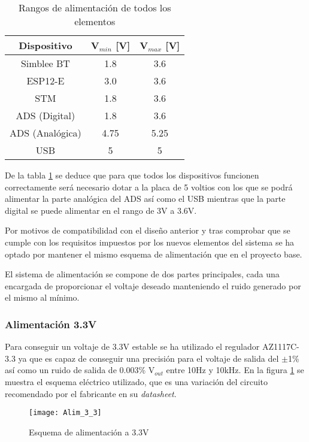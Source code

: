 \begin{table} [h]
	\centering
	\begin{tabular}{|c|c|c|}
	\hline 
	Dispositivo & V$_{min}$ [V] & V$_{max}$ [V] \\ 
	\hline 
	Simblee BT & 1.8 & 3.6 \\ 
	\hline 
	ESP12-E & 3.0 & 3.6 \\ 
	\hline 
	STM & 1.8 & 3.6 \\ 
	\hline 
	ADS (Digital) & 1.8 & 3.6 \\ 
	\hline 
	ADS (Analógica) & 4.75 & 5.25 \\ 
	\hline 
	USB & 5 & 5 \\ 
	\hline 
	\end{tabular} 
	\caption{Rangos de alimentación de todos los elementos}
	\label{tab:Alimentacion}
\end{table}

De la tabla \ref{tab:Alimentacion} se deduce que para que todos los dispositivos funcionen correctamente será necesario dotar a la placa de 5 voltios con los que se podrá alimentar la parte analógica del ADS así como el USB mientras que la parte digital se puede alimentar en el rango de 3V a 3.6V. 

Por motivos de compatibilidad con el diseño anterior y tras comprobar que se cumple con los requisitos impuestos por los nuevos elementos del sistema se ha optado por mantener el mismo esquema de alimentación que en el proyecto base.

El sistema de alimentación se compone de dos partes principales, cada una encargada de proporcionar el voltaje deseado manteniendo el ruido generado por el mismo al mínimo.

\subsubsection{Alimentación 3.3V\label{sec:Alimentacion_3.3V}}
Para conseguir un voltaje de 3.3V estable se ha utilizado el regulador AZ1117C-3.3 ya que es capaz de conseguir una precisión para el voltaje de salida del $\pm$1\% así como un ruido de salida de 0.003\% V$_{out}$ entre 10Hz y 10kHz.
En la figura \ref{fig:Alim_3.3} se muestra el esquema eléctrico utilizado, que es una variación del circuito recomendado por el fabricante en su \textit{datasheet}\cite{Datasheet_3.3}.

\begin{figure} [h]
    \centering
    \texttt{[image: Alim\_3\_3]}
    \caption{Esquema de alimentación a 3.3V}
    \label{fig:Alim_3.3}
\end{figure}

